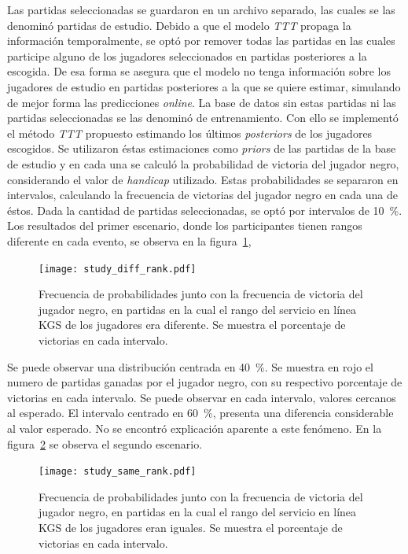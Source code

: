 \documentclass[11pt,twoside, spanish]{report} %
\begin{document}
Las partidas seleccionadas se guardaron en un archivo separado, las cuales se las denomin\'o  partidas de estudio.
Debido a que el modelo \textit{TTT} propaga la informaci\'on temporalmente, se opt\'o por remover todas las partidas en las cuales participe alguno de los jugadores seleccionados en partidas posteriores a la escogida.
De esa forma se asegura que el modelo no tenga informaci\'on sobre los jugadores de estudio en partidas posteriores a la que se quiere estimar, simulando de mejor forma las predicciones \textit{online}.
La base de datos sin estas partidas ni las partidas seleccionadas se las denomin\'o de entrenamiento.
Con ello se implement\'o el m\'etodo \textit{TTT} propuesto estimando los \'ultimos \textit{posteriors} de los jugadores escogidos.
Se utilizaron \'estas estimaciones como \textit{priors} de las partidas de la base de estudio y en cada una se calcul\'o la probabilidad de victoria del jugador negro, considerando el valor de \textit{handicap} utilizado.
Estas probabilidades se separaron en intervalos, calculando la frecuencia de victorias del jugador negro en cada una de \'estos.
Dada la cantidad de partidas seleccionadas, se opt\'o por intervalos de \SI{10}{\percent}.
Los resultados del primer escenario, donde los participantes tienen rangos diferente en cada evento, se observa en la figura~\ref{fig:diffRank}, 

\begin{figure}[H]
    \centering
    \texttt{[image: study\_diff\_rank.pdf]}
    \caption{Frecuencia de probabilidades junto con la frecuencia de victoria del jugador negro, en partidas en la cual el rango del servicio en l\'inea KGS de los jugadores era diferente. Se muestra el porcentaje de victorias en cada intervalo.}
    \label{fig:diffRank}
\end{figure}

Se puede observar una distribuci\'on centrada en  \SI{40}{\percent}. 
Se muestra en rojo el numero de partidas ganadas por el jugador negro, con su respectivo porcentaje de victorias en cada intervalo.
Se puede observar en cada intervalo, valores cercanos al esperado.
El intervalo centrado en \SI{60}{\percent}, presenta una diferencia considerable al valor esperado.
No se encontr\'o explicaci\'on aparente a este fen\'omeno.
En la figura~\ref{fig:sameRank} se observa el segundo escenario.


\begin{figure}[H]
    \centering
    \texttt{[image: study\_same\_rank.pdf]}
    \caption{Frecuencia de probabilidades junto con la frecuencia de victoria del jugador negro, en partidas en la cual el rango del servicio en l\'inea KGS de los jugadores eran iguales. Se muestra el porcentaje de victorias en cada intervalo.}
    \label{fig:sameRank}
\end{figure}
\end{document}
